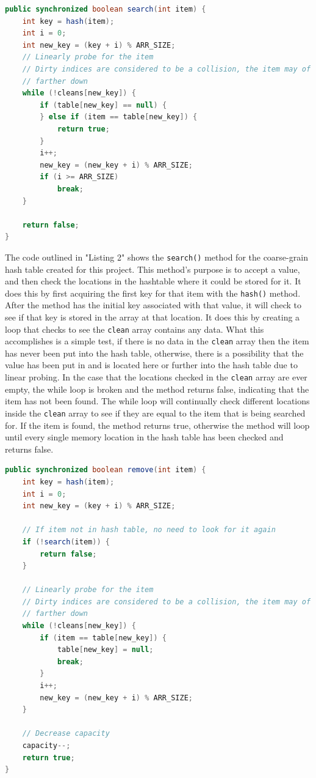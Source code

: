 \documentclass[conference]{IEEEtran}
\begin{document}
\begin{lstlisting}[language={Java},caption=Source code for the course-grain search() method.,captionpos=b,breaklines=true,frame=single]
public synchronized boolean search(int item) {
    int key = hash(item);
    int i = 0;
    int new_key = (key + i) % ARR_SIZE;
    // Linearly probe for the item
    // Dirty indices are considered to be a collision, the item may of been probed
    // farther down
    while (!cleans[new_key]) {
        if (table[new_key] == null) {
        } else if (item == table[new_key]) {
            return true;
        }
        i++;
        new_key = (new_key + i) % ARR_SIZE;
        if (i >= ARR_SIZE)
            break;
    }

    return false;
}
\end{lstlisting}

The code outlined in "Listing 2" shows the \verb|search()| method for the coarse-grain hash table created for this project. This method's purpose is to accept 
a value, and then check the locations in the hashtable where it could be stored for it. It does this by first acquiring the first key for that item with the
\verb|hash()| method. After the method has the initial key associated with that value, it will check to see if that key is stored in the array at that location.
It does this by creating a loop that checks to see the \verb|clean| array contains any data. What this accomplishes is a simple test, if there is no data in the \verb|clean| array
then the item has never been put into the hash table, otherwise, there is a possibility that the value has been put in and is located here or further into
the hash table due to linear probing. In the case that the locations checked in the \verb|clean| array are ever empty, the while loop is broken and the method returns
false, indicating that the item has not been found. The while loop will continually check different locations inside the \verb|clean| array to see if they are equal to
the item that is being searched for. If the item is found, the method returns true, otherwise the method will loop until every single memory location in the hash table has
been checked and returns false.

\begin{lstlisting}[language={Java},caption=Source code for the course-grain remove() method.,captionpos=b,breaklines=true,frame=single]
public synchronized boolean remove(int item) {
    int key = hash(item);
    int i = 0;
    int new_key = (key + i) % ARR_SIZE;

    // If item not in hash table, no need to look for it again
    if (!search(item)) {
        return false;
    }

    // Linearly probe for the item
    // Dirty indices are considered to be a collision, the item may of been probed
    // farther down
    while (!cleans[new_key]) {
        if (item == table[new_key]) {
            table[new_key] = null;
            break;
        }
        i++;
        new_key = (new_key + i) % ARR_SIZE;
    }

    // Decrease capacity
    capacity--;
    return true;
}
\end{lstlisting}
\end{document}
